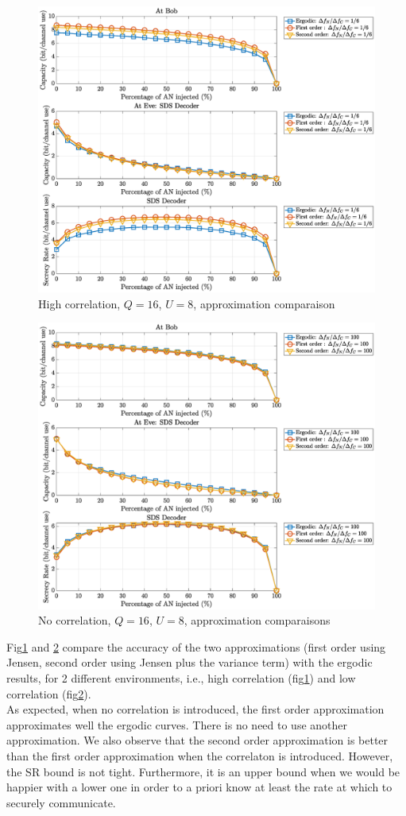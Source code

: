 \documentclass[12pt]{article}
\begin{document}
\begin{figure}[htb!]
	\centering
	\includegraphics[width=.67\linewidth]{img/comparaisonApprox_highCorrel_16Q8U.eps}
\caption{High correlation, $Q=16$, $U=8$, approximation comparaison}
	\label{fig:approxComparaison}
\end{figure}
\begin{figure}[htb!]
	\centering
	\includegraphics[width=.67\linewidth]{img/comparaisonApprox_noCorrel_16Q8U.eps}
	\caption{No correlation,  $Q=16$, $U=8$, approximation comparaisons}
	\label{fig:approxComparaison2}
\end{figure}
Fig\ref{fig:approxComparaison} and \ref{fig:approxComparaison2} compare the accuracy of the two approximations (first order using Jensen, second order using Jensen plus the variance term) with the ergodic results, for 2 different environments, i.e., high correlation (fig\ref{fig:approxComparaison}) and low correlation (fig\ref{fig:approxComparaison2}). \\

As expected, when no correlation is introduced, the first order approximation approximates well the ergodic curves. There is no need to use another approximation.  We also observe that the second order approximation is better than the first order approximation when the correlaton is introduced. However, the SR bound is not tight. Furthermore, it is an upper bound when we would be happier with a lower one in order to a priori know at least the rate at which to securely communicate. \\
\end{document}
